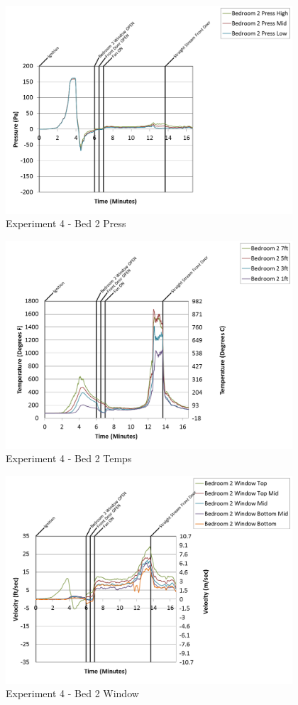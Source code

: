 \documentclass{article}
\begin{document}
\begin{appendices}
\begin{figure}[h!]
	\centering
	\includegraphics[height=3.05in]{0_Images/Results_Charts/Exp_4_Charts/Bed2Press.png}
	\caption{Experiment 4 - Bed 2 Press}
\end{figure}

\clearpage

\begin{figure}[h!]
	\centering
	\includegraphics[height=3.05in]{0_Images/Results_Charts/Exp_4_Charts/Bed2Temps.png}
	\caption{Experiment 4 - Bed 2 Temps}
\end{figure}


\begin{figure}[h!]
	\centering
	\includegraphics[height=3.05in]{0_Images/Results_Charts/Exp_4_Charts/Bed2Window.png}
	\caption{Experiment 4 - Bed 2 Window}
\end{figure}


\end{appendices}
\end{document}
